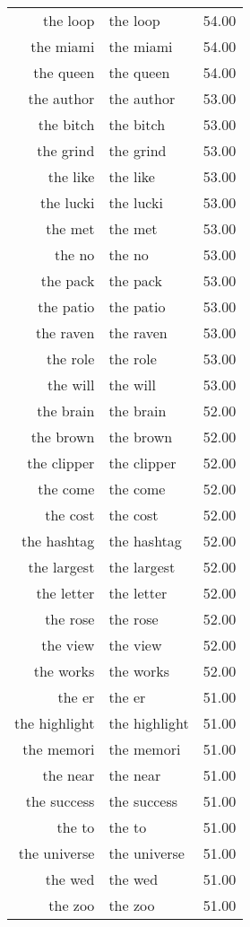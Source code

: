 \begin{table}[ht]
\begin{tabular}{rlr}
  the loop & the loop & 54.00 \\ 
  the miami & the miami & 54.00 \\ 
  the queen & the queen & 54.00 \\ 
  the author & the author & 53.00 \\ 
  the bitch & the bitch & 53.00 \\ 
  the grind & the grind & 53.00 \\ 
  the like & the like & 53.00 \\ 
  the lucki & the lucki & 53.00 \\ 
  the met & the met & 53.00 \\ 
  the no & the no & 53.00 \\ 
  the pack & the pack & 53.00 \\ 
  the patio & the patio & 53.00 \\ 
  the raven & the raven & 53.00 \\ 
  the role & the role & 53.00 \\ 
  the will & the will & 53.00 \\ 
  the brain & the brain & 52.00 \\ 
  the brown & the brown & 52.00 \\ 
  the clipper & the clipper & 52.00 \\ 
  the come & the come & 52.00 \\ 
  the cost & the cost & 52.00 \\ 
  the hashtag & the hashtag & 52.00 \\ 
  the largest & the largest & 52.00 \\ 
  the letter & the letter & 52.00 \\ 
  the rose & the rose & 52.00 \\ 
  the view & the view & 52.00 \\ 
  the works & the works & 52.00 \\ 
  the er & the er & 51.00 \\ 
  the highlight & the highlight & 51.00 \\ 
  the memori & the memori & 51.00 \\ 
  the near & the near & 51.00 \\ 
  the success & the success & 51.00 \\ 
  the to & the to & 51.00 \\ 
  the universe & the universe & 51.00 \\ 
  the wed & the wed & 51.00 \\ 
  the zoo & the zoo & 51.00 \\ 

\end{tabular}
\end{table}
